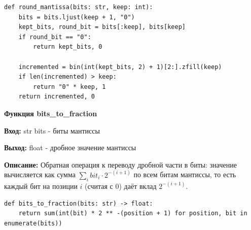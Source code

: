 \begin{lstlisting}[caption=round\_mantissa, label=lst:round-mantissa]
def round_mantissa(bits: str, keep: int):
    bits = bits.ljust(keep + 1, "0")
    kept_bits, round_bit = bits[:keep], bits[keep]
    if round_bit == "0":
        return kept_bits, 0

    incremented = bin(int(kept_bits, 2) + 1)[2:].zfill(keep)
    if len(incremented) > keep:
        return "0" * keep, 1
    return incremented, 0
\end{lstlisting}

\textbf{Функция bits\_to\_fraction } \par
\textbf{Вход:} str bits - биты мантиссы \par
\textbf{Выход:} float - дробное значение мантиссы \par
\textbf{Описание:} Обратная операция к переводу дробной части в биты: значение вычисляется как сумма $\sum_i bit_i \cdot 2^{-(i+1)}$ по всем битам мантиссы, то есть каждый бит на позиции $i$ (считая с 0) даёт вклад $2^{-(i+1)}$.\par
\vspace{10pt}

\begin{lstlisting}[caption=bits\_to\_fraction, label=lst:bits-to-fraction]
def bits_to_fraction(bits: str) -> float:
    return sum(int(bit) * 2 ** -(position + 1) for position, bit in enumerate(bits))
\end{lstlisting}

\newpage
